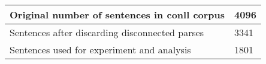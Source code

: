 	\begin{tabular}{|l|l|}
		\hline
		Original number of sentences in conll corpus & 4096\\ 
		\hline
		Sentences after discarding disconnected parses & 3341\\ 
		\hline
		Sentences used for experiment and analysis & 1801\\ 
		\hline
	\end{tabular}
